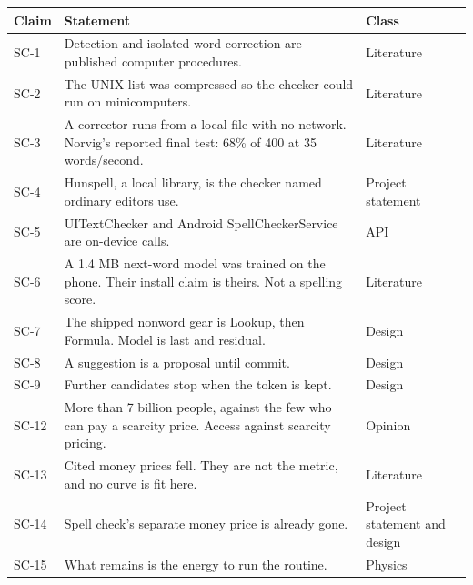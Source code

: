 \documentclass[
  10pt,
]{article}
\newcounter{none} %
\begin{document}
{\def\LTcaptype{none} %
\begin{longtable}[]{@{}
  >{\raggedright\arraybackslash}p{}
  >{\raggedright\arraybackslash}p{}
  >{\raggedright\arraybackslash}p{}@{}}
\toprule\noalign{}
\begin{minipage}[b]{\linewidth}\raggedright
Claim
\end{minipage} & \begin{minipage}[b]{\linewidth}\raggedright
Statement
\end{minipage} & \begin{minipage}[b]{\linewidth}\raggedright
Class
\end{minipage} \\
\midrule\noalign{}
\endhead
\bottomrule\noalign{}
\endlastfoot
SC-1 & Detection and isolated-word correction are published computer
procedures. & Literature \\
SC-2 & The UNIX list was compressed so the checker could run on
minicomputers. & Literature \\
SC-3 & A corrector runs from a local file with no network. Norvig's
reported final test: 68\% of 400 at 35 words/second. & Literature \\
SC-4 & Hunspell, a local library, is the checker named ordinary editors
use. & Project statement \\
SC-5 & UITextChecker and Android SpellCheckerService are on-device
calls. & API \\
SC-6 & A 1.4 MB next-word model was trained on the phone. Their install
claim is theirs. Not a spelling score. & Literature \\
SC-7 & The shipped nonword gear is Lookup, then Formula. Model is last
and residual. & Design \\
SC-8 & A suggestion is a proposal until commit. & Design \\
SC-9 & Further candidates stop when the token is kept. & Design \\
SC-12 & More than 7 billion people, against the few who can pay a
scarcity price. Access against scarcity pricing. & Opinion \\
SC-13 & Cited money prices fell. They are not the metric, and no curve
is fit here. & Literature \\
SC-14 & Spell check's separate money price is already gone. & Project
statement and design \\
SC-15 & What remains is the energy to run the routine. & Physics \\

\end{longtable}}
\end{document}

